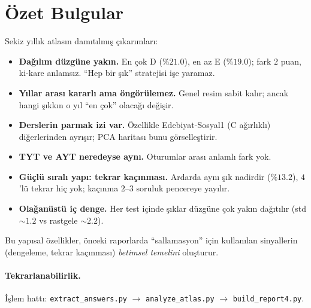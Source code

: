 \documentclass[11pt]{article}
\begin{document}
\section{Özet Bulgular}
Sekiz yıllık atlasın damıtılmış çıkarımları:
\begin{itemize}
  \item \textbf{Dağılım düzgüne yakın.} En çok D ($\%21.0$), en az E ($\%19.0$);
  fark $2$ puan, ki-kare anlamsız. ``Hep bir şık'' stratejisi işe yaramaz.
  \item \textbf{Yıllar arası kararlı ama öngörülemez.} Genel resim sabit kalır;
  ancak hangi şıkkın o yıl ``en çok'' olacağı değişir.
  \item \textbf{Derslerin parmak izi var.} Özellikle Edebiyat-Sosyal1 (C
  ağırlıklı) diğerlerinden ayrışır; PCA haritası bunu görselleştirir.
  \item \textbf{TYT ve AYT neredeyse aynı.} Oturumlar arası anlamlı fark yok.
  \item \textbf{Güçlü sıralı yapı: tekrar kaçınması.} Ardarda aynı şık nadirdir
  ($\%13.2$), $4$'lü tekrar hiç yok; kaçınma $2$--$3$ soruluk pencereye yayılır.
  \item \textbf{Olağanüstü iç denge.} Her test içinde şıklar düzgüne çok yakın
  dağıtılır (std $\sim 1.2$ vs rastgele $\sim 2.2$).
\end{itemize}
Bu yapısal özellikler, önceki raporlarda ``sallamasyon'' için kullanılan
sinyallerin (dengeleme, tekrar kaçınması) \emph{betimsel temelini} oluşturur.

\paragraph{Tekrarlanabilirlik.} İşlem hattı: \texttt{extract\_answers.py}
$\rightarrow$ \texttt{analyze\_atlas.py} $\rightarrow$ \texttt{build\_report4.py}.
\end{document}
